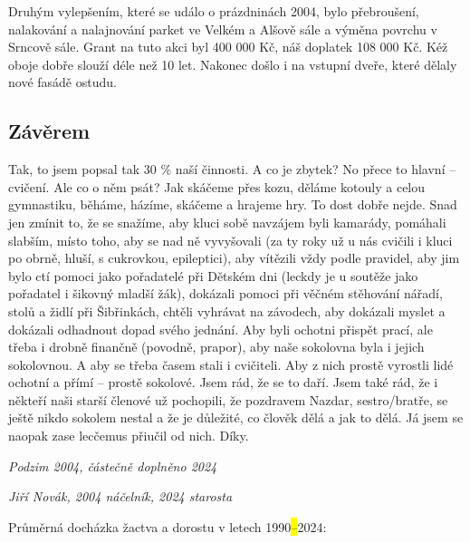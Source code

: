 Druhým vylepšením, které se událo o prázdninách 2004, bylo přebroušení,
nalakování a nalajnování parket ve Velkém a Alšově sále a výměna povrchu
v Srncově sále. Grant na tuto akci byl 400 000 Kč, náš doplatek 108 000
Kč. Kéž oboje dobře slouží déle než 10 let. Nakonec došlo i na vstupní
dveře, které dělaly nové fasádě ostudu.

\subsection{Závěrem}\label{zuxe1vux11brem}

Tak, to jsem popsal tak 30 \% naší činnosti. A co je zbytek? No přece to
hlavní -- cvičení. Ale co o něm psát? Jak skáčeme přes kozu, děláme
kotouly a celou gymnastiku, běháme, házíme, skáčeme a hrajeme hry. To
dost dobře nejde. Snad jen zmínit to, že se snažíme, aby kluci sobě
navzájem byli kamarády, pomáhali slabším, místo toho, aby se nad ně
vyvyšovali (za ty roky už u nás cvičili i kluci po obrně, hluší, s
cukrovkou, epileptici), aby vítězili vždy podle pravidel, aby jim bylo
ctí pomoci jako pořadatelé při Dětském dni (leckdy je u soutěže jako
pořadatel i šikovný mladší žák), dokázali pomoci při věčném stěhování
nářadí, stolů a židlí při Šibřinkách, chtěli vyhrávat na závodech, aby
dokázali myslet a dokázali odhadnout dopad svého jednání. Aby byli
ochotni přispět prací, ale třeba i drobně finančně (povodně, prapor),
aby naše sokolovna byla i jejich sokolovnou. A aby se třeba časem stali
i cvičiteli. Aby z nich prostě vyrostli lidé ochotní a přímí -- prostě
sokolové. Jsem rád, že se to daří. Jsem také rád, že i někteří naši
starší členové už pochopili, že pozdravem Nazdar, sestro/bratře, se
ještě nikdo sokolem nestal a že je důležité, co člověk dělá a jak to
dělá. Já jsem se naopak zase lecčemus přiučil od nich. Díky.

\emph{Podzim 2004, částečně doplněno 2024}

\emph{Jiří Novák, 2004 náčelník, 2024 starosta}

Průměrná docházka žactva a dorostu v letech 1990\emph{\hl{--}}2024:

